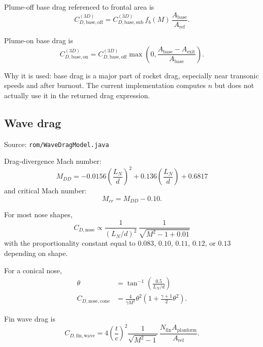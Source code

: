 \documentclass[11pt]{article}
\begin{document}
Plume-off base drag referenced to frontal area is
\begin{equation*}
C_{D,\mathrm{base,off}}^{(3D)} = C_{D,\mathrm{base,sub}}^{(3D)}\,f_b(M)\,\frac{A_{\mathrm{base}}}{A_{\mathrm{ref}}}.
\end{equation*}

Plume-on base drag is
\begin{equation*}
C_{D,\mathrm{base,on}}^{(3D)} = C_{D,\mathrm{base,off}}^{(3D)}\max\!\left(0,\frac{A_{\mathrm{base}}-A_{\mathrm{exit}}}{A_{\mathrm{base}}}\right).
\end{equation*}

Why it is used: base drag is a major part of rocket drag, especially near transonic speeds and after burnout.
The current implementation computes $n$ but does not actually use it in the returned drag expression.

\subsection{Wave drag}
Source: \texttt{rom/WaveDragModel.java}

Drag-divergence Mach number:
\begin{equation*}
M_{DD} = -0.0156\left(\frac{L_N}{d}\right)^2 + 0.136\left(\frac{L_N}{d}\right) + 0.6817
\end{equation*}
and critical Mach number:
\begin{equation*}
M_{cr} = M_{DD} - 0.10.
\end{equation*}

For most nose shapes,
\begin{equation*}
C_{D,\mathrm{nose}} \propto \frac{1}{(L_N/d)^2}\,\frac{1}{\sqrt{M^2-1+0.01}}
\end{equation*}
with the proportionality constant equal to $0.083$, $0.10$, $0.11$, $0.12$, or $0.13$ depending on shape.

For a conical nose,
\begin{align*}
\theta &= \tan^{-1}\!\left(\frac{0.5}{L_N/d}\right) \\
C_{D,\mathrm{nose,cone}} &= \frac{4}{\gamma M^2}\theta^2\left(1 + \frac{\gamma+1}{2}\theta^2\right).
\end{align*}

Fin wave drag is
\begin{equation*}
C_{D,\mathrm{fin,wave}} = 4\left(\frac{t}{c}\right)^2\frac{1}{\sqrt{M^2-1}}\,
\frac{N_{\mathrm{fin}}A_{\mathrm{planform}}}{A_{\mathrm{ref}}}.
\end{equation*}
\end{document}
